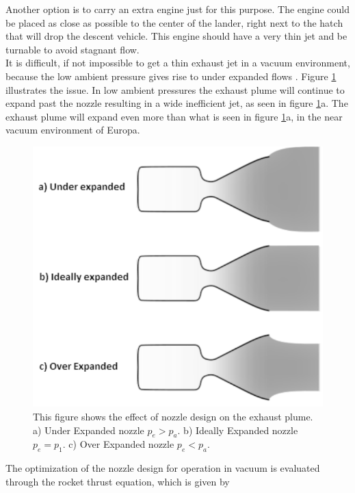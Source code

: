 Another option is to carry an extra engine just for this purpose. The engine could be placed as close as possible to the center of the lander, right next to the hatch that will drop the descent vehicle. This engine should have a very thin jet and be turnable to avoid stagnant flow. \\

It is difficult, if not impossible to get a thin exhaust jet in a vacuum environment, because the low ambient pressure gives rise to under expanded flows \cite{spacecraft}. Figure \ref{jetflows} illustrates the issue. In low ambient pressures the exhaust plume will continue to expand past the nozzle resulting in a wide inefficient jet, as seen in figure \ref{jetflows}a. The exhaust plume will expand even more  than what is seen in figure \ref{jetflows}a, in the near vacuum environment of Europa. 

\begin{figure}[htb]
\begin{center}
\includegraphics[scale=0.5]{figures/navtheory/nozzle}
\caption{This figure shows the effect of nozzle design on the exhaust plume. a) Under Expanded nozzle $p_e>p_a$. b) Ideally Expanded nozzle $p_e=p_1$. c) Over Expanded nozzle $p_e<p_a$. }
\label{jetflows}
\end{center}
\end{figure}

The optimization of the nozzle design for operation in vacuum is evaluated through the rocket thrust equation, which is given by \cite{spacecraft}

